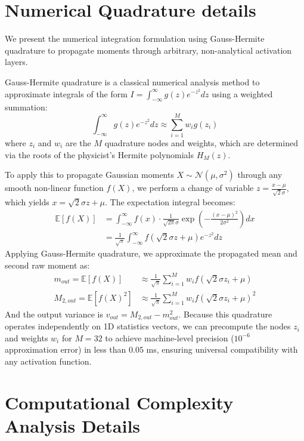 \documentclass{article}
\theoremstyle{plain}
\theoremstyle{definition}
\theoremstyle{remark}
\begin{document}
\section{Numerical Quadrature details}
\label{app:quadrature}

We present the numerical integration formulation using Gauss-Hermite quadrature to propagate moments through arbitrary, non-analytical activation layers.

Gauss-Hermite quadrature is a classical numerical analysis method to approximate integrals of the form $I = \int_{-\infty}^{\infty} g(z) e^{-z^2} dz$ using a weighted summation:
\begin{equation}
    \int_{-\infty}^{\infty} g(z) e^{-z^2} dz \approx \sum_{i=1}^M w_i g(z_i)
\end{equation}
where $z_i$ and $w_i$ are the $M$ quadrature nodes and weights, which are determined via the roots of the physicist's Hermite polynomials $H_M(z)$.

To apply this to propagate Gaussian moments $X \sim \mathcal{N}(\mu, \sigma^2)$ through any smooth non-linear function $f(X)$, we perform a change of variable $z = \frac{x-\mu}{\sqrt{2}\sigma}$, which yields $x = \sqrt{2}\sigma z + \mu$. The expectation integral becomes:
\begin{align}
    \mathbb{E}[f(X)] &= \int_{-\infty}^{\infty} f(x) \cdot \frac{1}{\sqrt{2\pi}\sigma} \exp\left( -\frac{(x-\mu)^2}{2\sigma^2} \right) dx \nonumber \\
    &= \frac{1}{\sqrt{\pi}} \int_{-\infty}^{\infty} f(\sqrt{2}\sigma z + \mu) e^{-z^2} dz
\end{align}
Applying Gauss-Hermite quadrature, we approximate the propagated mean and second raw moment as:
\begin{align}
    m_{out} = \mathbb{E}[f(X)] &\approx \frac{1}{\sqrt{\pi}} \sum_{i=1}^M w_i f(\sqrt{2}\sigma z_i + \mu) \\
    M_{2, out} = \mathbb{E}[f(X)^2] &\approx \frac{1}{\sqrt{\pi}} \sum_{i=1}^M w_i f(\sqrt{2}\sigma z_i + \mu)^2
\end{align}
And the output variance is $v_{out} = M_{2, out} - m_{out}^2$. Because this quadrature operates independently on 1D statistics vectors, we can precompute the nodes $z_i$ and weights $w_i$ for $M=32$ to achieve machine-level precision ($10^{-6}$ approximation error) in less than $0.05$ ms, ensuring universal compatibility with any activation function.

\section{Computational Complexity Analysis Details}
\label{app:complexity}
\end{document}
